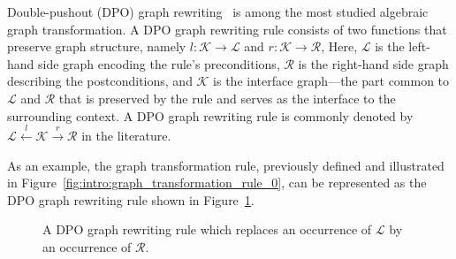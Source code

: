  Double-pushout (DPO) graph rewriting~\cite{corradini1997algebraic,habel2001double} is among the most studied algebraic graph transformation. A DPO graph rewriting rule consists of two functions that preserve graph structure, namely $l:\mathcal{K} \to \mathcal{L}$ and $r:\mathcal{K} \to \mathcal{R}$,
 Here, \(\mathcal{L}\) is the left-hand side graph encoding the rule's preconditions, \(\mathcal{R}\) is the right-hand side graph describing the postconditions, and \(\mathcal{K}\) is the interface graph—the part common to \(\mathcal{L}\) and \(\mathcal{R}\) that is preserved by the rule and serves as the interface to the surrounding context. A DPO graph rewriting rule is commonly denoted by \(\mathcal{L} \xleftarrow{l} \mathcal{K} \xrightarrow{r} \mathcal{R}\) in the literature.
 
 As an example, the graph transformation rule, previously defined and illustrated in Figure~\ref{fig:intro:graph_transformation_rule_0}, can be represented as the DPO graph rewriting rule shown in Figure~\ref{fig:intro:graph_transformation_rule_0_dpo}.

 \begin{figure}[H]
    \centering
    \caption{A DPO graph rewriting rule which replaces an occurrence of \(\mathcal{L}\) by an occurrence of \(\mathcal{R}\).
    }
    \label{fig:intro:graph_transformation_rule_0_dpo}
    \end{figure} 

